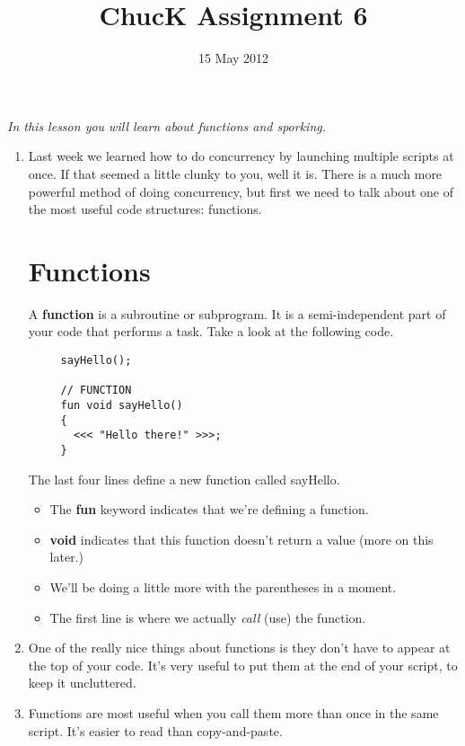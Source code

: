 \documentclass{article}
\title{ChucK Assignment 6}
\date{15 May 2012}
\begin{document}
\maketitle

\textsl{In this lesson you will learn about functions and sporking.}\vspace{2mm}

\begin {enumerate}

\item Last week we learned how to do concurrency by launching multiple scripts at once. If that seemed a little clunky to you, well it is. There is a much more powerful method of doing concurrency, but first we need to talk about one of the most useful code structures: functions.

\section{Functions}

A \textbf{function} is a subroutine or subprogram. It is a semi-independent part of your code that performs a task. Take a look at the following code.

\begin{lstlisting}
     sayHello();
 
     // FUNCTION
     fun void sayHello()
     {
       <<< "Hello there!" >>>;
     } 
\end{lstlisting}

The last four lines define a new function called sayHello.

\begin{itemize}
\item The \textbf{fun} keyword indicates that we're defining a function.
\item \textbf{void} indicates that this function doesn't return a value (more on this later.)
\item We'll be doing a little more with the parentheses in a moment.
\item The first line is where we actually \textsl{call} (use) the function.
\end {itemize}

\item One of the really nice things about functions is they don't have to appear at the top of your code. It's very useful to put them at the end of your script, to keep it uncluttered.

\item Functions are most useful when you call them more than once in the same script. It's easier to read than copy-and-paste.


\end{enumerate}
\end{document}
